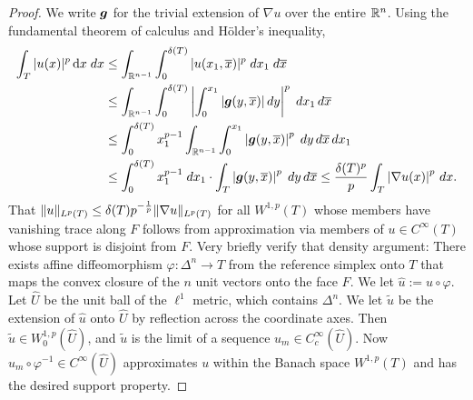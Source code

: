 \documentclass[10pt,letterpaper]{article}
\begin{document}
\begin{proof}
    We write $\bm{g}$ for the trivial extension of $\nabla u$ over the entire ${\mathbb R}^{n}$.
    Using the fundamental theorem of calculus and H\"older's inequality, 
    \begin{align*}
        \int_{T} |u(x)|^{p} \mathop{}\!\mathrm{d} x \;dx
        &\leq
        \int_{{\mathbb R}^{n-1}} \int_{0}^{{\delta}(T)} |u( x_{1}, \overline x )|^{p} \;dx_{1} \;d\overline{x}
        \\&
        \leq
        \int_{{\mathbb R}^{n-1}} \int_{0}^{{\delta}(T)} \left| \int_{0}^{x_{1}} |\bm{g}( y, \overline x )| \,dy \right|^{p} \;dx_{1} \,d\overline{x}
        \\&
        \leq
        \int_{0}^{{\delta}(T)} x_{1}^{p-1} \int_{{\mathbb R}^{n-1}} \int_{0}^{x_{1}} \left| \bm{g}( y, \overline x ) \right|^{p} \;dy \,d\overline{x} \,dx_{1}
        \\&
        \leq
        \int_{0}^{{\delta}(T)} x_{1}^{p-1} \;dx_1 
        \cdot 
        \int_{T} \left| \bm{g}( y, \overline x ) \right|^{p} \;dy \,d\overline{x} 
        \leq
        \frac{{\delta}(T)^{p}}{p} \int_{T} \left| \nabla u( x ) \right|^{p} \,dx
        .
    \end{align*}
    That $\|u\|_{L^{p}(T)} \leq {\delta}(T) p^{-\frac 1 p} \|\nabla u\|_{L^{p}(T)}$ 
    for all $W^{1,p}(T)$ whose members have vanishing trace along $F$ follows from approximation via members of $u \in C^{\infty}(T)$ whose support is disjoint from $F$. 
    Very briefly verify that density argument: 
    There exists affine diffeomorphism $\varphi : \Delta^{n} \rightarrow T$ from the reference simplex onto $T$ that maps the convex closure of the $n$ unit vectors onto the face $F$.
    We let $\hat u := u \circ \varphi$.
    Let $\hat U$ be the unit ball of the $\ell^1$ metric, which contains $\Delta^{n}$.
    We let $\tilde u$ be the extension of $\hat u$ onto $\hat U$ by reflection across the coordinate axes.
    Then $\tilde u \in W^{1,p}_{0}(\hat U)$, and $\tilde u$ is the limit of a sequence $u_{m} \in C^{\infty}_{c}(\hat U)$.
    Now $u_{m} \circ \varphi^{-1} \in C^{\infty}(\hat U)$ approximates $u$ within the Banach space $W^{1,p}(T)$
    and has the desired support property. 
\end{proof}
\end{document}
